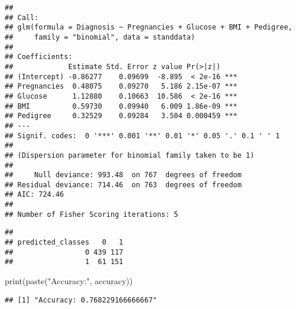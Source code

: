 \documentclass[
]{article}
\newenvironment{Shaded}{\begin{snugshade}}{\end{snugshade}}
\newcommand{\AttributeTok}[1]{\textcolor[rgb]{0.77,0.63,0.00}{#1}}
\newcommand{\CommentTok}[1]{\textcolor[rgb]{0.56,0.35,0.01}{\textit{#1}}}
\newcommand{\DecValTok}[1]{\textcolor[rgb]{0.00,0.00,0.81}{#1}}
\newcommand{\FloatTok}[1]{\textcolor[rgb]{0.00,0.00,0.81}{#1}}
\newcommand{\FunctionTok}[1]{\textcolor[rgb]{0.00,0.00,0.00}{#1}}
\newcommand{\NormalTok}[1]{#1}
\newcommand{\OtherTok}[1]{\textcolor[rgb]{0.56,0.35,0.01}{#1}}
\newcommand{\SpecialCharTok}[1]{\textcolor[rgb]{0.00,0.00,0.00}{#1}}
\newcommand{\StringTok}[1]{\textcolor[rgb]{0.31,0.60,0.02}{#1}}
\begin{document}
\begin{verbatim}
## 
## Call:
## glm(formula = Diagnosis ~ Pregnancies + Glucose + BMI + Pedigree, 
##     family = "binomial", data = standdata)
## 
## Coefficients:
##             Estimate Std. Error z value Pr(>|z|)    
## (Intercept) -0.86277    0.09699  -8.895  < 2e-16 ***
## Pregnancies  0.48075    0.09270   5.186 2.15e-07 ***
## Glucose      1.12880    0.10663  10.586  < 2e-16 ***
## BMI          0.59730    0.09940   6.009 1.86e-09 ***
## Pedigree     0.32529    0.09284   3.504 0.000459 ***
## ---
## Signif. codes:  0 '***' 0.001 '**' 0.01 '*' 0.05 '.' 0.1 ' ' 1
## 
## (Dispersion parameter for binomial family taken to be 1)
## 
##     Null deviance: 993.48  on 767  degrees of freedom
## Residual deviance: 714.46  on 763  degrees of freedom
## AIC: 724.46
## 
## Number of Fisher Scoring iterations: 5
\end{verbatim}

\begin{Shaded}
\end{Shaded}

\begin{verbatim}
##                  
## predicted_classes   0   1
##                 0 439 117
##                 1  61 151
\end{verbatim}

\begin{Shaded}
\begin{Highlighting}[]
\FunctionTok{print}\NormalTok{(}\FunctionTok{paste}\NormalTok{(}\StringTok{"Accuracy:"}\NormalTok{, accuracy))}
\end{Highlighting}
\end{Shaded}

\begin{verbatim}
## [1] "Accuracy: 0.768229166666667"
\end{verbatim}
\end{document}
